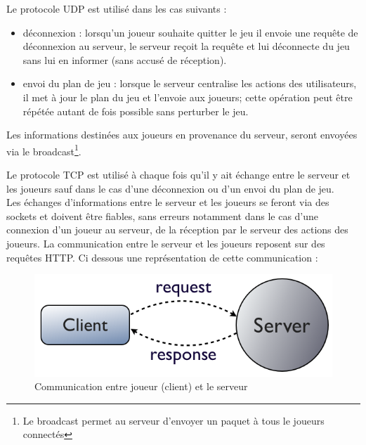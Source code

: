 \par
Le protocole UDP est utilisé dans les cas suivants :
\begin{itemize}
	\item déconnexion : lorsqu'un joueur souhaite quitter le jeu il envoie une requête de déconnexion au serveur, le serveur reçoit la requête et lui déconnecte du jeu sans lui en informer (sans accusé de réception).
	
	\item envoi du plan de jeu : lorsque le serveur centralise les actions des utilisateurs, il met à jour le plan du jeu et l'envoie aux joueurs; cette opération peut être répétée autant de fois possible sans perturber le jeu.\\
\end{itemize}
Les informations destinées aux joueurs en provenance du serveur, seront envoyées via le broadcast\footnote{Le broadcast permet au serveur d'envoyer un paquet à tous le joueurs connectés}. \\

\par
Le protocole TCP est utilisé à chaque fois qu'il y ait échange entre le serveur et les joueurs sauf dans le cas d'une déconnexion ou d'un envoi du plan de jeu.\\

Les échanges d'informations entre le serveur et les joueurs se feront via des sockets et doivent être fiables, sans erreurs notamment dans le cas d'une connexion d'un joueur au serveur, de la réception par le serveur des actions des joueurs. 
La communication entre le serveur et les joueurs reposent sur des requêtes HTTP. Ci dessous une représentation de cette communication : 

\begin{figure}[ht]
	\centering
	\includegraphics[scale = 0.29]{img/communicationHTTP.png}
	\caption{Communication entre joueur (client) et le serveur}
\end{figure}